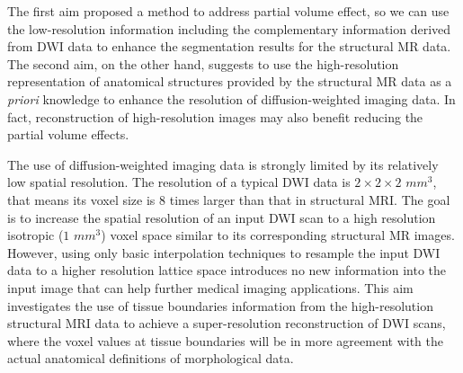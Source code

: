 The first aim proposed a method to address partial volume effect, so we can use the low-resolution information including the complementary information derived from DWI data to enhance the segmentation results for the structural MR data.
The second aim, on the other hand, suggests to use the high-resolution representation of anatomical structures provided by the structural MR data as a \emph{priori} knowledge to enhance the resolution of diffusion-weighted imaging data. In fact, reconstruction of high-resolution images may also benefit reducing the partial volume effects.

The use of diffusion-weighted imaging data is strongly limited by its relatively low spatial resolution. The resolution of a typical DWI data is $2 \times 2 \times 2$  $mm^3$, that means its voxel size is $8$ times larger than that in structural MRI.
The goal is to increase the spatial resolution of an input DWI scan to a high resolution isotropic ($1$ $mm^3$) voxel space similar to its corresponding structural MR images. However, using only basic interpolation techniques to resample the input DWI data to a higher resolution lattice space introduces no new information into the input image that can help further medical imaging applications. This aim investigates the use of tissue boundaries information from the high-resolution structural MRI data to achieve a super-resolution reconstruction of DWI scans, where the voxel values at tissue boundaries will be in more agreement with the actual anatomical definitions of morphological data.
\newline